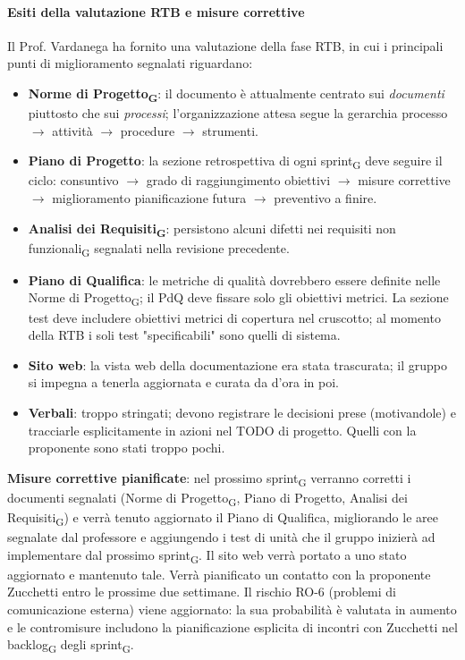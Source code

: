 \documentclass[11pt,a4paper]{article}
\newcommand{\gls}[1]{#1\textsubscript{G}}
\begin{document}
\paragraph{Esiti della valutazione RTB e misure correttive}
Il Prof. Vardanega ha fornito una valutazione della fase RTB, in cui i principali punti di miglioramento segnalati riguardano:
\begin{itemize}
    \item \textbf{\gls{Norme di Progetto}}: il documento è attualmente centrato sui \textit{documenti} piuttosto che sui \textit{processi}; l'organizzazione attesa segue la gerarchia processo $\rightarrow$ attività $\rightarrow$ procedure $\rightarrow$ strumenti.
    
    \item \textbf{Piano di Progetto}: la sezione retrospettiva di ogni \gls{sprint} deve seguire il ciclo: consuntivo $\rightarrow$ grado di raggiungimento obiettivi $\rightarrow$ misure correttive $\rightarrow$ miglioramento pianificazione futura $\rightarrow$ preventivo a finire.
    
    \item \textbf{\gls{Analisi dei Requisiti}}: persistono alcuni difetti nei \gls{requisiti non funzionali} segnalati nella revisione precedente.
    
    \item \textbf{Piano di Qualifica}: le metriche di qualità dovrebbero essere definite nelle \gls{Norme di Progetto}; il PdQ deve fissare solo gli obiettivi metrici. La sezione test deve includere obiettivi metrici di copertura nel cruscotto; al momento della RTB i soli test "specificabili" sono quelli di sistema.
    
    \item \textbf{Sito web}: la vista web della documentazione era stata trascurata; il gruppo si impegna a tenerla aggiornata e curata da d'ora in poi.
    
    \item \textbf{Verbali}: troppo stringati; devono registrare le decisioni prese (motivandole) e tracciarle esplicitamente in azioni nel TODO di progetto. Quelli con la proponente sono stati troppo pochi.
\end{itemize}

\textbf{Misure correttive pianificate}: nel prossimo \gls{sprint} verranno corretti i documenti segnalati (\gls{Norme di Progetto}, Piano di Progetto, \gls{Analisi dei Requisiti}) e verrà tenuto aggiornato il Piano di Qualifica, migliorando le aree segnalate dal professore e aggiungendo i test di unità che il gruppo inizierà ad implementare dal prossimo \gls{sprint}. Il sito web verrà portato a uno stato aggiornato e mantenuto tale. Verrà pianificato un contatto con la proponente Zucchetti entro le prossime due settimane. Il rischio RO-6 (problemi di comunicazione esterna) viene aggiornato: la sua probabilità è valutata in aumento e le contromisure includono la pianificazione esplicita di incontri con Zucchetti nel \gls{backlog} degli \gls{sprint}.
 
\end{document}
